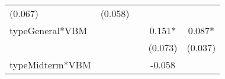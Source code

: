 \documentclass[]{article}
\begin{document}
\begin{longtable}[]{@{}lcccc@{}}
\begin{minipage}[t]{0.14\columnwidth}
(0.067)\strut
\end{minipage} & \begin{minipage}[t]{0.14\columnwidth}\centering\strut
(0.058)\strut
\end{minipage}\tabularnewline
\begin{minipage}[t]{0.26\columnwidth}\raggedright\strut
typeGeneral*VBM\strut
\end{minipage} & \begin{minipage}[t]{0.12\columnwidth}\centering\strut
\strut
\end{minipage} & \begin{minipage}[t]{0.13\columnwidth}\centering\strut
\strut
\end{minipage} & \begin{minipage}[t]{0.14\columnwidth}\centering\strut
0.151*\strut
\end{minipage} & \begin{minipage}[t]{0.14\columnwidth}\centering\strut
0.087*\strut
\end{minipage}\tabularnewline
\begin{minipage}[t]{0.26\columnwidth}\raggedright\strut
\strut
\end{minipage} & \begin{minipage}[t]{0.12\columnwidth}\centering\strut
\strut
\end{minipage} & \begin{minipage}[t]{0.13\columnwidth}\centering\strut
\strut
\end{minipage} & \begin{minipage}[t]{0.14\columnwidth}\centering\strut
(0.073)\strut
\end{minipage} & \begin{minipage}[t]{0.14\columnwidth}\centering\strut
(0.037)\strut
\end{minipage}\tabularnewline
\begin{minipage}[t]{0.26\columnwidth}\raggedright\strut
typeMidterm*VBM\strut
\end{minipage} & \begin{minipage}[t]{0.12\columnwidth}\centering\strut
\strut
\end{minipage} & \begin{minipage}[t]{0.13\columnwidth}\centering\strut
\strut
\end{minipage} & \begin{minipage}[t]{0.14\columnwidth}\centering\strut
-0.058\strut
\end{minipage} & \begin{minipage}[t]{0.14\columnwidth}\centering\strut

\end{minipage}
\end{longtable}
\end{document}
